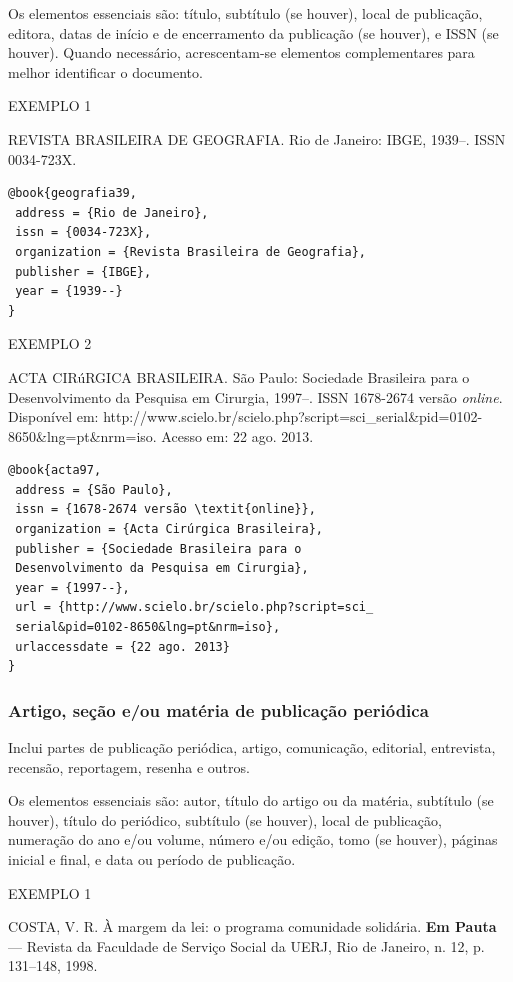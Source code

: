 Os elementos essenciais são: título, subtítulo (se houver), local de publicação, editora, datas de início e de encerramento da publicação (se houver), e ISSN (se houver). Quando necessário, acrescentam-se elementos complementares para melhor identificar o documento.

EXEMPLO 1 

REVISTA BRASILEIRA DE GEOGRAFIA. Rio de Janeiro: IBGE, 1939--. ISSN 0034-723X.

\begin{verbatim}
@book{geografia39,
 address = {Rio de Janeiro},
 issn = {0034-723X},
 organization = {Revista Brasileira de Geografia},
 publisher = {IBGE},
 year = {1939--}
}
\end{verbatim}

EXEMPLO 2 

ACTA CIRúRGICA BRASILEIRA. São Paulo: Sociedade Brasileira para o Desenvolvimento da Pesquisa em Cirurgia, 1997–. ISSN 1678-2674 versão \textit{online}. Disponível em: http://www.scielo.br/scielo.php?script=sci\_serial\&pid=0102-8650\&lng=pt\&nrm=iso. Acesso em: 22 ago. 2013.

\begin{verbatim}
@book{acta97,
 address = {São Paulo},
 issn = {1678-2674 versão \textit{online}},
 organization = {Acta Cirúrgica Brasileira},
 publisher = {Sociedade Brasileira para o 
 Desenvolvimento da Pesquisa em Cirurgia},
 year = {1997--},
 url = {http://www.scielo.br/scielo.php?script=sci_
 serial&pid=0102-8650&lng=pt&nrm=iso},
 urlaccessdate = {22 ago. 2013}
}
\end{verbatim}

\subsubsection{Artigo, seção e/ou matéria de publicação periódica}

Inclui partes de publicação periódica, artigo, comunicação, editorial, entrevista, recensão, reportagem, resenha e outros.

Os elementos essenciais são: autor, título do artigo ou da matéria, subtítulo (se houver), título do periódico, subtítulo (se houver), local de publicação, numeração do ano e/ou volume, número e/ou edição, tomo (se houver), páginas inicial e final, e data ou período de publicação.

EXEMPLO 1

COSTA, V. R. À margem da lei: o programa comunidade solidária. \textbf{Em Pauta} — Revista da Faculdade de Serviço Social da UERJ, Rio de Janeiro, n. 12, p. 131–148, 1998.


